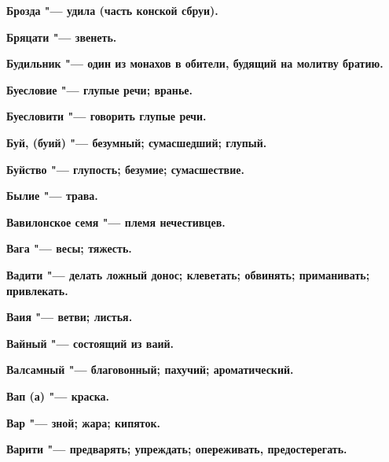 \bfseries Брозда \normalfont{} "--- удила (часть конской сбруи). 




\bfseries Бряцати \normalfont{} "--- звенеть. 




\bfseries Будильник \normalfont{} "--- один из монахов в обители, будящий на молитву братию. 




\bfseries Буесловие \normalfont{} "--- глупые речи; вранье. 




\bfseries Буесловити \normalfont{} "--- говорить глупые речи. 




\bfseries Буй, (буий) \normalfont{} "--- безумный; сумасшедший; глупый. 




\bfseries Буйство \normalfont{} "--- глупость; безумие; сумасшествие. 




\bfseries Былие \normalfont{} "--- трава. 




 





\bfseries Вавилонское семя \normalfont{} "--- племя нечестивцев. 




\bfseries Вага \normalfont{} "--- весы; тяжесть. 




\bfseries Вадити \normalfont{} "--- делать ложный донос; клеветать; обвинять; приманивать; привлекать. 




\bfseries Ваия \normalfont{} "--- ветви; листья. 




\bfseries Вайный \normalfont{} "--- состоящий из ваий. 




\bfseries Валсамный \normalfont{} "--- благовонный; пахучий; ароматический. 




\bfseries Вап (а) \normalfont{} "--- краска. 




\bfseries Вар \normalfont{} "--- зной; жара; кипяток. 




\bfseries Варити \normalfont{} "--- предварять; упреждать; опереживать, предостерегать. 




